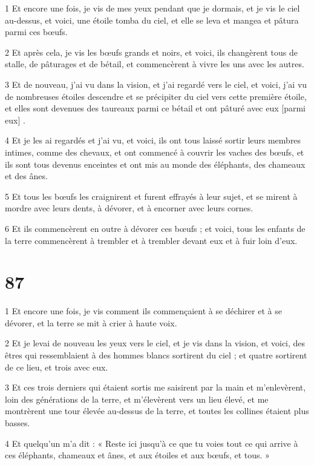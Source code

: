 \par 1 Et encore une fois, je vis de mes yeux pendant que je dormais, et je vis le ciel au-dessus, et voici, une étoile tomba du ciel, et elle se leva et mangea et pâtura parmi ces bœufs.
\par 2 Et après cela, je vis les bœufs grands et noirs, et voici, ils changèrent tous de stalle, de pâturages et de bétail, et commencèrent à vivre les uns avec les autres.
\par 3 Et de nouveau, j'ai vu dans la vision, et j'ai regardé vers le ciel, et voici, j'ai vu de nombreuses étoiles descendre et se précipiter du ciel vers cette première étoile, et elles sont devenues des taureaux parmi ce bétail et ont pâturé avec eux [parmi eux] .
\par 4 Et je les ai regardés et j'ai vu, et voici, ils ont tous laissé sortir leurs membres intimes, comme des chevaux, et ont commencé à couvrir les vaches des bœufs, et ils sont tous devenus enceintes et ont mis au monde des éléphants, des chameaux et des ânes.
\par 5 Et tous les bœufs les craignirent et furent effrayés à leur sujet, et se mirent à mordre avec leurs dents, à dévorer, et à encorner avec leurs cornes.
\par 6 Et ils commencèrent en outre à dévorer ces bœufs ; et voici, tous les enfants de la terre commencèrent à trembler et à trembler devant eux et à fuir loin d'eux.

\chapter{87}

\par 1 Et encore une fois, je vis comment ils commençaient à se déchirer et à se dévorer, et la terre se mit à crier à haute voix.
\par 2 Et je levai de nouveau les yeux vers le ciel, et je vis dans la vision, et voici, des êtres qui ressemblaient à des hommes blancs sortirent du ciel ; et quatre sortirent de ce lieu, et trois avec eux.
\par 3 Et ces trois derniers qui étaient sortis me saisirent par la main et m'enlevèrent, loin des générations de la terre, et m'élevèrent vers un lieu élevé, et me montrèrent une tour élevée au-dessus de la terre, et toutes les collines étaient plus basses.
\par 4 Et quelqu'un m'a dit : « Reste ici jusqu'à ce que tu voies tout ce qui arrive à ces éléphants, chameaux et ânes, et aux étoiles et aux bœufs, et tous. »

